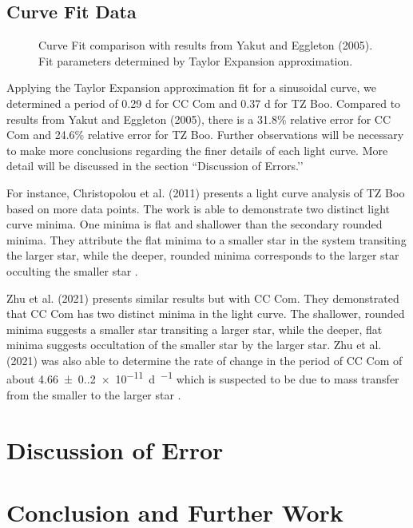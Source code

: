 \documentclass[12pt]{article}
\begin{document}
\subsection{Curve Fit Data}
\begin{figure}[htpb]
    \begin{center}
        
        
    \end{center}
    \caption{Curve Fit comparison with results from Yakut and Eggleton (2005). Fit parameters determined by Taylor Expansion approximation.}
\end{figure}

Applying the Taylor Expansion approximation fit for a sinusoidal curve, we determined a period of 0.29 d for CC Com and 0.37 d for TZ Boo. Compared to results from Yakut and Eggleton (2005), there is a 31.8\% relative error for CC Com and 24.6\% relative error for TZ Boo. Further observations will be necessary to make more conclusions regarding the finer details of each light curve. More detail will be discussed in the section ``Discussion of Errors.’’


For instance, Christopolou et al. (2011) presents a light curve analysis of TZ Boo based on more data points. The work is able to demonstrate two distinct light curve minima. One minima is flat and shallower than the secondary rounded minima. They attribute the flat minima to a smaller star in the system transiting the larger star, while the deeper, rounded minima corresponds to the larger star occulting the smaller star \cite{2011AJ....142...99C}.

Zhu et al. (2021) presents similar results but with CC Com. They demonstrated that CC Com has two distinct minima in the light curve. The shallower, rounded minima suggests a smaller star transiting a larger star, while the deeper, flat minima suggests occultation of the smaller star by the larger star. Zhu et al. (2021) was also able to determine the rate of change in the period of CC Com of about \SI{4.66(0.20)e-11}{\day\per\year} which is suspected to be due to mass transfer from the smaller to the larger star \cite{2021RAA....21...84Z}.

\section{Discussion of Error}

\section{Conclusion and Further Work}
\newpage
 

\end{document}
